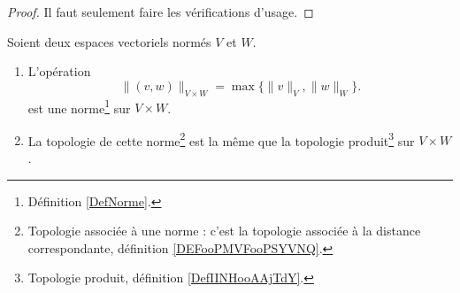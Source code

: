 \begin{proof}
    Il faut seulement faire les vérifications d'usage.
\end{proof}

\begin{lemmaDef}        \label{LEMooFQMSooLmdIvD}
    Soient deux espaces vectoriels normés \( V\) et \( W\). 
    \begin{enumerate}
        \item 
            L'opération
            \begin{equation}	\label{EqNormeVxWmax}
                \|(v,w) \|_{V\times W}=\max\{\|v\|_{V},\|w\|_W\}.
            \end{equation}
            est une norme\footnote{Définition \ref{DefNorme}.} sur \( V\times W\).
        \item
            La topologie de cette norme\footnote{Topologie associée à une norme : c'est la topologie associée à la distance correspondante, définition \ref{DEFooPMVFooPSYVNQ}.} est la même que la topologie produit\footnote{Topologie produit, définition \ref{DefIINHooAAjTdY}.} sur \( V\times W\).
    \end{enumerate}
\end{lemmaDef}

